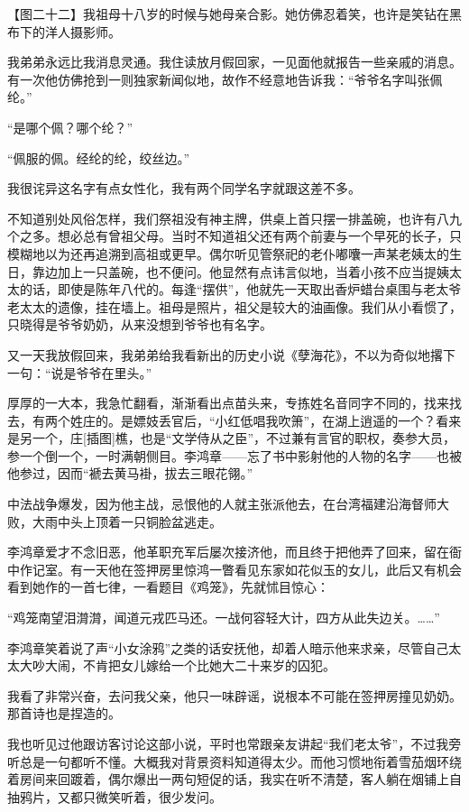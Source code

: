\par 【图二十二】我祖母十八岁的时候与她母亲合影。她仿佛忍着笑，也许是笑钻在黑布下的洋人摄影师。
\par 我弟弟永远比我消息灵通。我住读放月假回家，一见面他就报告一些亲戚的消息。有一次他仿佛抢到一则独家新闻似地，故作不经意地告诉我：“爷爷名字叫张佩纶。”
\par “是哪个佩？哪个纶？”
\par “佩服的佩。经纶的纶，绞丝边。”
\par 我很诧异这名字有点女性化，我有两个同学名字就跟这差不多。
\par 不知道别处风俗怎样，我们祭祖没有神主牌，供桌上首只摆一排盖碗，也许有八九个之多。想必总有曾祖父母。当时不知道祖父还有两个前妻与一个早死的长子，只模糊地以为还再追溯到高祖或更早。偶尔听见管祭祀的老仆嘟囔一声某老姨太的生日，靠边加上一只盖碗，也不便问。他显然有点讳言似地，当着小孩不应当提姨太太的话，即使是陈年八代的。每逢“摆供”，他就先一天取出香炉蜡台桌围与老太爷老太太的遗像，挂在墙上。祖母是照片，祖父是较大的油画像。我们从小看惯了，只晓得是爷爷奶奶，从来没想到爷爷也有名字。
\par 又一天我放假回来，我弟弟给我看新出的历史小说《孽海花》，不以为奇似地撂下一句：“说是爷爷在里头。”
\par 厚厚的一大本，我急忙翻看，渐渐看出点苗头来，专拣姓名音同字不同的，找来找去，有两个姓庄的。是嫖妓丢官后，“小红低唱我吹箫”，在湖上逍遥的一个？看来是另一个，庄[插图]樵，也是“文学侍从之臣”，不过兼有言官的职权，奏参大员，参一个倒一个，一时满朝侧目。李鸿章——忘了书中影射他的人物的名字——也被他参过，因而“褫去黄马褂，拔去三眼花翎。”
\par 中法战争爆发，因为他主战，忌恨他的人就主张派他去，在台湾福建沿海督师大败，大雨中头上顶着一只铜脸盆逃走。
\par 李鸿章爱才不念旧恶，他革职充军后屡次接济他，而且终于把他弄了回来，留在衙中作记室。有一天他在签押房里惊鸿一瞥看见东家如花似玉的女儿，此后又有机会看到她作的一首七律，一看题目《鸡笼》，先就怵目惊心：
\par “鸡笼南望泪潸潸，闻道元戎匹马还。一战何容轻大计，四方从此失边关。……”
\par 李鸿章笑着说了声“小女涂鸦”之类的话安抚他，却着人暗示他来求亲，尽管自己太太大吵大闹，不肯把女儿嫁给一个比她大二十来岁的囚犯。
\par 我看了非常兴奋，去问我父亲，他只一味辟谣，说根本不可能在签押房撞见奶奶。那首诗也是捏造的。
\par 我也听见过他跟访客讨论这部小说，平时也常跟亲友讲起“我们老太爷”，不过我旁听总是一句都听不懂。大概我对背景资料知道得太少。而他习惯地衔着雪茄烟环绕着房间来回踱着，偶尔爆出一两句短促的话，我实在听不清楚，客人躺在烟铺上自抽鸦片，又都只微笑听着，很少发问。
